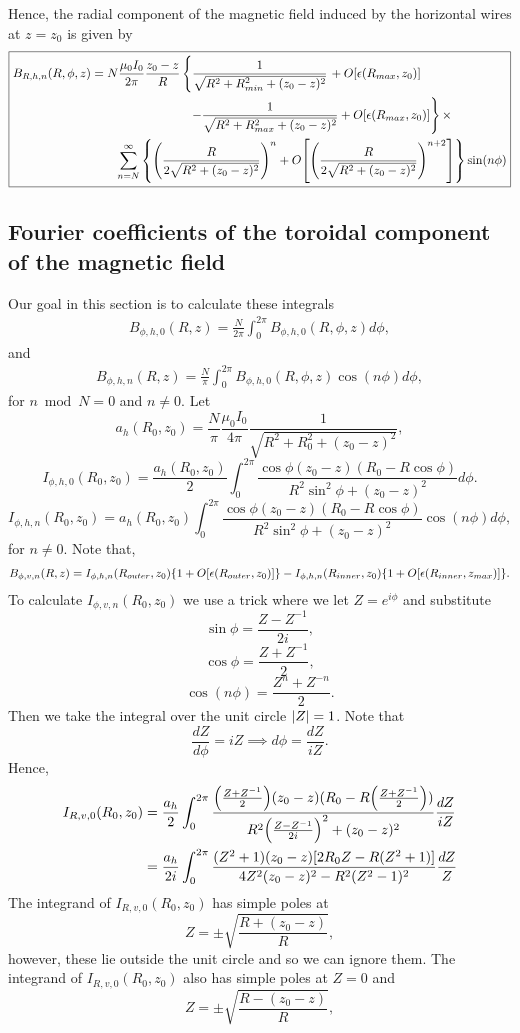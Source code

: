 \documentclass{article}
\begin{document}
Hence, the radial component of the magnetic field induced by the horizontal wires at $z=z_0$
is given by
\[
\boxed{
\begin{aligned}
B_{R,h,n}(R, \phi, z) &= N\frac{\mu_0I_0}{2\pi}\frac{z_0-z}{R}\left\{\frac{1}{\sqrt{R^2+R_{min}^2+(z_0-z)^2}}\right. + O[\epsilon(R_{max}, z_0)] \\
&\qquad\qquad\qquad\qquad\left.-\frac{1}{\sqrt{R^2+R_{max}^2+(z_0-z)^2}} + O[\epsilon(R_{max}, z_0)]\right\}\times \\
&\qquad\sum_{n=N}^{\infty}\qty{\qty(\frac{R}{2\sqrt{R^2+(z_0-z)^2}})^{n}+O\qty[\qty(\frac{R}{2\sqrt{R^2+(z_0-z)^2}})^{n+2}]}\sin(n\phi)
\end{aligned}
}
\]

\subsection{Fourier coefficients of the toroidal component of the magnetic field}

Our goal in this section is to calculate these integrals
\[\begin{aligned}
B_{\phi, h, 0}(R, z)= \frac{N}{2\pi}\int_0^{2\pi} B_{\phi, h, 0}(R, \phi, z)d\phi,
\end{aligned}\]
and
\[\begin{aligned}
B_{\phi, h, n}(R, z)= \frac{N}{\pi}\int_0^{2\pi} B_{\phi, h, 0}(R, \phi, z)\cos(n\phi)d\phi,
\end{aligned}\]
for $n \bmod N = 0$ and $n\ne0$.
Let
\[a_h(R_0, z_0)=\frac{N}{\pi}\frac{\mu_0 I_0}{4\pi}\frac{1}{\sqrt{R^2+R_0^2+(z_0-z)^2}},\]
\[I_{\phi,h,0}(R_0, z_0) = \frac{a_h(R_0, z_0)}{2}\int_0^{2\pi}\frac{\cos\phi(z_0-z)(R_0-R\cos\phi)}{R^2\sin^2\phi+(z_0-z)^2} d\phi.\]
\[I_{\phi,h,n}(R_0, z_0) = a_h(R_0, z_0)\int_0^{2\pi}\frac{\cos\phi(z_0-z)(R_0-R\cos\phi)}{R^2\sin^2\phi+(z_0-z)^2}\cos(n\phi) d\phi,\]
for $n\ne 0$.
Note that,
\[\begin{aligned}
B_{\phi, v, n}(R, z)= I_{\phi,h,n}(R_{outer}, z_0)\qty{1+O[\epsilon(R_{outer}, z_0)]} - I_{\phi,h,n}(R_{inner}, z_0)\qty{1+O[\epsilon(R_{inner}, z_{max})]}.
\end{aligned}\]
To calculate $I_{\phi,v,n}(R_0, z_0)$  we use a trick where we let $Z=e^{i\phi}$ and substitute
\[\sin\phi = \frac{Z-Z^{-1}}{2i},\]
\[\cos\phi = \frac{Z+Z^{-1}}{2},\]
\[\cos(n\phi) = \frac{Z^n+Z^{-n}}{2}.\]
Then we take the integral over the unit circle $\abs{Z}=1$.
Note that
\[\frac{dZ}{d\phi} = iZ \implies d\phi = \frac{dZ}{iZ}.\]
Hence,
\[\begin{aligned}
I_{R,v,0}(R_0, z_0) &= \frac{a_h}{2}\int_0^{2\pi}\frac{\qty(\frac{Z+Z^{-1}}{2})(z_0-z)(R_0-R\qty(\frac{Z+Z^{-1}}{2}))}{R^2\qty(\frac{Z-Z^{-1}}{2i})^2+(z_0-z)^2} \frac{dZ}{iZ} \\
&= \frac{a_h}{2i}\int_0^{2\pi}\frac{(Z^2+1)(z_0-z)[2R_0Z-R(Z^2+1)]}{4Z^2(z_0-z)^2-R^2(Z^2-1)^2} \frac{dZ}{Z}\\
\end{aligned}\]
The integrand of $I_{R,v,0}(R_0, z_0)$ has simple poles at
\[Z=\pm\sqrt{\frac{R+(z_0-z)}{R}},\]
however, these lie outside the unit circle and so we can ignore them.
The integrand of $I_{R,v,0}(R_0, z_0)$ also has simple poles at $Z=0$ and
\[Z=\pm\sqrt{\frac{R-(z_0-z)}{R}},\]
\end{document}
